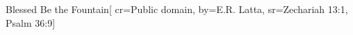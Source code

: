 {Blessed Be the Fountain}[
    cr={Public domain},
    by={E.R. Latta},
    sr={Zechariah 13:1, Psalm 36:9}]
